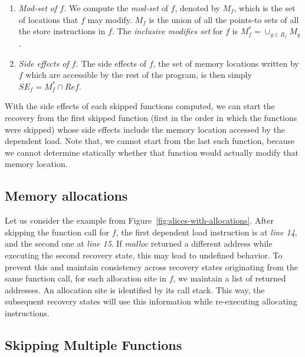 {\begin{enumerate}[leftmargin=*]
\item \textit{Mod-set of $f$.}  We compute the \textit{mod-set} of
  $f$, denoted by $M_f$, which is the set of locations that $f$ may
  modify.  $M_f$ is the union of all the points-to sets of all the
  store instructions in $f$.  The \textit{inclusive modifies set} for
  $f$ is $M^{*}_f = \cup_{g \in R_f} M_g$.

\item \textit{Side effects of $f$.}  The side effects of $f$, \ie the
  set of memory locations written by $f$ which are accessible by the
  rest of the program, is then simply $SE_f = M^{*}_f \cap Ref$.

\end{enumerate}

With the side effects of each skipped functions computed, we can start
the recovery from the first skipped function (first in the order in
which the functions were skipped) whose side effects include the
memory location accessed by the dependent load.  Note that, we cannot
start from the last such function, because we cannot determine
statically whether that function would actually modify that memory
location.
}



\subsection{Memory allocations} \label{Se:Malloc}

Let us consider the example
from Figure~\ref{fig:slices-with-allocations}.  After skipping the
function call for $f$, the first dependent load instruction is at
\textit{line 14}, and the second one at \textit{line 15}.
If \textit{malloc} returned a different address while executing the
second recovery state, this may lead to undefined behavior.
To prevent this and maintain consistency across recovery states
originating from the same function call, for each allocation site in
$f$, we maintain a list of returned addresses.  An allocation site is
identified by its call stack.  This way, the subsequent recovery
states will use this information while re-executing allocating
instructions.

 



\subsection{Skipping Multiple Functions}\label{Se:SkipMultipleFuncs}

